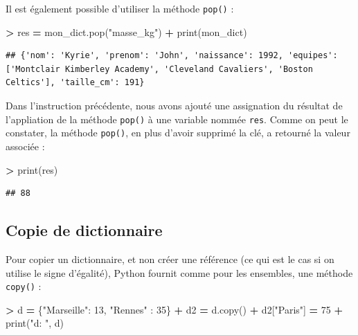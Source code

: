\documentclass[12pt,]{book}
\newenvironment{Shaded}{\begin{snugshade}}{\end{snugshade}}
\newcommand{\DecValTok}[1]{\textcolor[rgb]{0.00,0.00,0.81}{#1}}
\newcommand{\StringTok}[1]{\textcolor[rgb]{0.31,0.60,0.02}{#1}}
\newcommand{\OperatorTok}[1]{\textcolor[rgb]{0.81,0.36,0.00}{\textbf{#1}}}
\newcommand{\BuiltInTok}[1]{#1}
\newcommand{\NormalTok}[1]{#1}
\numberwithin{equation}{section}
\numberwithin{countremarque}{section}
\begin{document}
Il est également possible d'utiliser la méthode \texttt{pop()} :

\begin{Shaded}
\begin{Highlighting}[]
\OperatorTok{>}\NormalTok{ res }\OperatorTok{=}\NormalTok{ mon_dict.pop(}\StringTok{"masse_kg"}\NormalTok{)}
\OperatorTok{+} \BuiltInTok{print}\NormalTok{(mon_dict)}
\end{Highlighting}
\end{Shaded}

\begin{lstlisting}
## {'nom': 'Kyrie', 'prenom': 'John', 'naissance': 1992, 'equipes': ['Montclair Kimberley Academy', 'Cleveland Cavaliers', 'Boston Celtics'], 'taille_cm': 191}
\end{lstlisting}

Dans l'instruction précédente, nous avons ajouté une assignation du
résultat de l'appliation de la méthode \texttt{pop()} à une variable
nommée \texttt{res}. Comme on peut le constater, la méthode
\texttt{pop()}, en plus d'avoir supprimé la clé, a retourné la valeur
associée :

\begin{Shaded}
\begin{Highlighting}[]
\OperatorTok{>} \BuiltInTok{print}\NormalTok{(res)}
\end{Highlighting}
\end{Shaded}

\begin{lstlisting}
## 88
\end{lstlisting}

\subsection{Copie de dictionnaire}\label{copie-de-dictionnaire}

Pour copier un dictionnaire, et non créer une référence (ce qui est le
cas si on utilise le signe d'égalité), Python fournit comme pour les
ensembles, une méthode \texttt{copy()} :

\begin{Shaded}
\begin{Highlighting}[]
\OperatorTok{>}\NormalTok{ d }\OperatorTok{=}\NormalTok{ \{}\StringTok{"Marseille"}\NormalTok{: }\DecValTok{13}\NormalTok{, }\StringTok{"Rennes"}\NormalTok{ : }\DecValTok{35}\NormalTok{\}}
\OperatorTok{+}\NormalTok{ d2 }\OperatorTok{=}\NormalTok{ d.copy()}
\OperatorTok{+}\NormalTok{ d2[}\StringTok{"Paris"}\NormalTok{] }\OperatorTok{=} \DecValTok{75}
\OperatorTok{+} \BuiltInTok{print}\NormalTok{(}\StringTok{"d: "}\NormalTok{, d)}
\end{Highlighting}
\end{Shaded}
\end{document}
